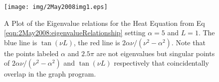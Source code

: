 
\begin{figure}[ht]
\texttt{[image: img/2May2008img1.eps]}
\caption[Eigenvalue Relations for Heat Equation]{A Plot of
  the Eigenvalue relations for the Heat Equation from Eq
  \eqref{eqn:2May2008:eigenvalueRelationship} setting
  $\alpha=5$ and $L=1$. The blue line is $\tan(\nu L)$, the
  red line is $2\alpha\nu/(\nu^2-\alpha^2)$. Note that the
  points labeled $\alpha$ and $2.5\pi$ are not eigenvalues
  but singular points of $2\alpha\nu/(\nu^2-\alpha^2)$ and
  $\tan(\nu L)$ respectively that coincidentally overlap in
  the graph program.}\label{fig:2May2008:eigenPlot}
\end{figure}

